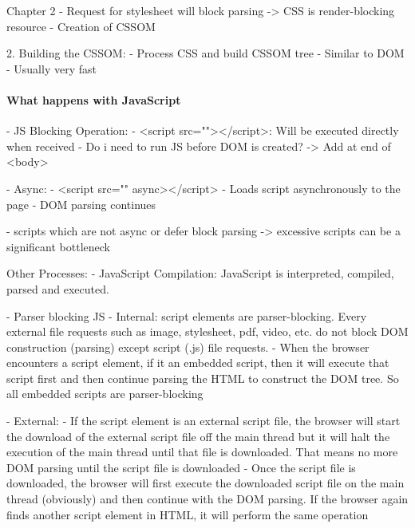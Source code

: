 Chapter 2
- Request for stylesheet will block parsing -> CSS is render-blocking resource
- Creation of CSSOM


2. Building the CSSOM:
- Process CSS and build CSSOM tree
- Similar to DOM
- Usually very fast






\paragraph{What happens with JavaScript}




- JS Blocking Operation:
	- <script src=""></script>: Will be executed directly when received
	- Do i need to run JS before DOM is created?
	-> Add at end of <body>

- Async:
	- <script src="" async></script>
	- Loads script asynchronously to the page
	- DOM parsing continues
	
	
- scripts which are not async or defer block parsing -> excessive scripts can be a significant bottleneck



Other Processes:
- JavaScript Compilation: JavaScript is interpreted, compiled, parsed and executed.





- Parser blocking JS
- Internal: script elements are parser-blocking. Every external file requests such as image, stylesheet, pdf, video, etc. do not block DOM construction (parsing) except script (.js) file requests.
- When the browser encounters a script element, if it an embedded script, then it will execute that script first and then continue parsing the HTML to construct the DOM tree. So all embedded scripts are parser-blocking

- External:
- If the script element is an external script file, the browser will start the download of the external script file off the main thread but it will halt the execution of the main thread until that file is downloaded. That means no more DOM parsing until the script file is downloaded
- Once the script file is downloaded, the browser will first execute the downloaded script file on the main thread (obviously) and then continue with the DOM parsing. If the browser again finds another script element in HTML, it will perform the same operation

